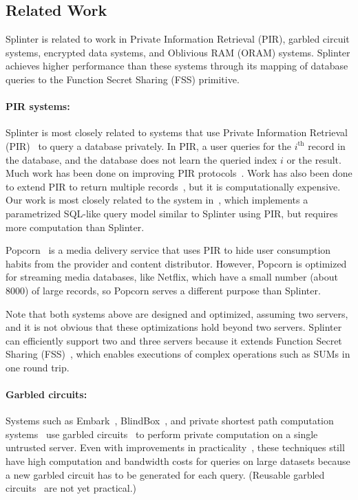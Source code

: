 \subsection{Related Work}
\label{spl-sec:related}
Splinter is related to work in Private Information Retrieval (PIR),
garbled circuit systems, encrypted data systems, 
and Oblivious RAM (ORAM) systems. Splinter achieves higher performance than these systems 
through its mapping of database queries to the Function Secret Sharing (FSS) primitive.

\paragraph{PIR systems:}
Splinter is most closely related to systems that use Private
Information Retrieval (PIR)~\cite{chor1998private} to query a database privately.
In PIR, a user queries for the $i^\mathrm{th}$ record in the database, and the database
does not learn the queried index $i$ or the result.
Much work has been done on improving 
PIR protocols~\cite{ostrovsky2007survey, olumofin2011revisiting}. 
Work has also been done to extend PIR to return multiple records~\cite{groth2010multi},
but it is computationally expensive.
Our work is most closely related to the system in~\cite{goldberg}, which implements
a parametrized SQL-like query model similar to Splinter using PIR, but requires
more computation than Splinter.

Popcorn~\cite{popcorn} is a media delivery service that 
uses PIR to hide user consumption habits from the provider
and content distributor. However, Popcorn is optimized for
streaming media databases, like Netflix, which have a small number (about 8000)
of large records, so Popcorn serves a different purpose than Splinter.

Note that both systems above are designed and optimized, assuming
two servers, and it is not obvious that these optimizations hold beyond two servers.
Splinter can efficiently support two and three servers because it 
extends Function Secret Sharing (FSS)~\cite{fss,gilboa2014distributed}, which 
enables executions of complex operations such as SUMs in one round trip.

\paragraph{Garbled circuits:}
Systems such as Embark~\cite{lan2016embark}, BlindBox~\cite{blindbox}, 
and private shortest path computation systems~\cite{wu2016}
use garbled circuits~\cite{Yao, goldwasser1997multi} to perform private computation
on a single untrusted server.
Even with improvements in practicality~\cite{bellare2013efficient}, these
techniques still have high computation and bandwidth costs for queries on
large datasets because a new garbled circuit has to be generated for each query.
(Reusable garbled circuits~\cite{goldwasser:sfe} are not yet practical.)

